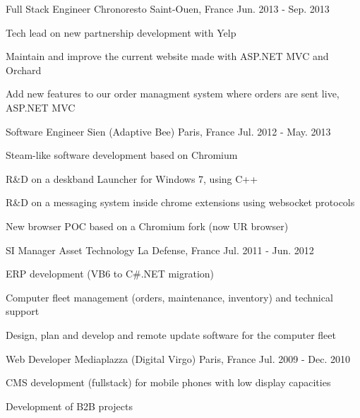 \begin{cventries}
  \cventry
    {Full Stack Engineer} %
    {Chronoresto} %
    {Saint-Ouen, France} %
    {Jun. 2013 - Sep. 2013} %
    {
      \begin{cvitems} %
        \item {Tech lead on new partnership development with Yelp}
        \item {Maintain and improve the current website made with ASP.NET MVC and Orchard}
        \item {Add new features to our order managment system where orders are sent live, ASP.NET MVC}
      \end{cvitems}
    }

  \cventry
    {Software Engineer} %
    {Sien (Adaptive Bee)} %
    {Paris, France} %
    {Jul. 2012 - May. 2013} %
    {
      \begin{cvitems} %
        \item {Steam-like software development based on Chromium}
        \item {R\&D on a deskband Launcher for Windows 7, using C++ }
        \item {R\&D on a messaging system inside chrome extensions using websocket protocols}
        \item {New browser POC based on a Chromium fork (now UR browser)}
      \end{cvitems}
    }

  \cventry
    {SI Manager} %
    {Asset Technology} %
    {La Defense, France} %
    {Jul. 2011 - Jun. 2012} %
    {
      \begin{cvitems} %
        \item {ERP development (VB6 to C\#.NET migration)}
        \item {Computer fleet management (orders, maintenance, inventory) and technical support}
        \item {Design, plan and develop and remote update software for the computer fleet}
      \end{cvitems}
    }

  \cventry
    {Web Developer} %
    {Mediaplazza (Digital Virgo)} %
    {Paris, France} %
    {Jul. 2009 - Dec. 2010} %
    {
      \begin{cvitems} %
        \item {CMS development (fullstack) for mobile phones with low display capacities}
        \item {Development of B2B projects}
      \end{cvitems}
    }

\end{cventries}
